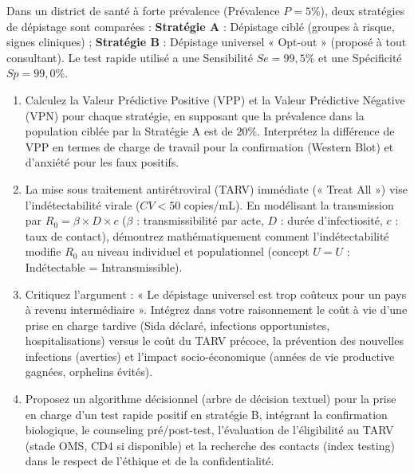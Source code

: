 \documentclass[11pt]{article}
\begin{document}
\begin{exercice}
Dans un district de santé à forte prévalence (Prévalence $P = 5\%$), deux stratégies de dépistage sont comparées : \textbf{Stratégie A} : Dépistage ciblé (groupes à risque, signes cliniques) ; \textbf{Stratégie B} : Dépistage universel « Opt-out » (proposé à tout consultant). Le test rapide utilisé a une Sensibilité $Se = 99,5\%$ et une Spécificité $Sp = 99,0\%$.

\begin{enumerate}
    \item Calculez la Valeur Prédictive Positive (VPP) et la Valeur Prédictive Négative (VPN) pour chaque stratégie, en supposant que la prévalence dans la population ciblée par la Stratégie A est de $20\%$. Interprétez la différence de VPP en termes de charge de travail pour la confirmation (Western Blot) et d'anxiété pour les faux positifs.
    \item La mise sous traitement antirétroviral (TARV) immédiate (« Treat All ») vise l'indétectabilité virale ($CV < 50$ copies/mL). En modélisant la transmission par $R_0 = \beta \times D \times c$ ($\beta$ : transmissibilité par acte, $D$ : durée d'infectiosité, $c$ : taux de contact), démontrez mathématiquement comment l'indétectabilité modifie $R_0$ au niveau individuel et populationnel (concept $U=U$ : Indétectable = Intransmissible).
    \item Critiquez l'argument : « Le dépistage universel est trop coûteux pour un pays à revenu intermédiaire ». Intégrez dans votre raisonnement le coût à vie d'une prise en charge tardive (Sida déclaré, infections opportunistes, hospitalisations) versus le coût du TARV précoce, la prévention des nouvelles infections (averties) et l'impact socio-économique (années de vie productive gagnées, orphelins évités).
    \item Proposez un algorithme décisionnel (arbre de décision textuel) pour la prise en charge d'un test rapide positif en stratégie B, intégrant la confirmation biologique, le counseling pré/post-test, l'évaluation de l'éligibilité au TARV (stade OMS, CD4 si disponible) et la recherche des contacts (index testing) dans le respect de l'éthique et de la confidentialité.
\end{enumerate}
\end{exercice}
\end{document}
